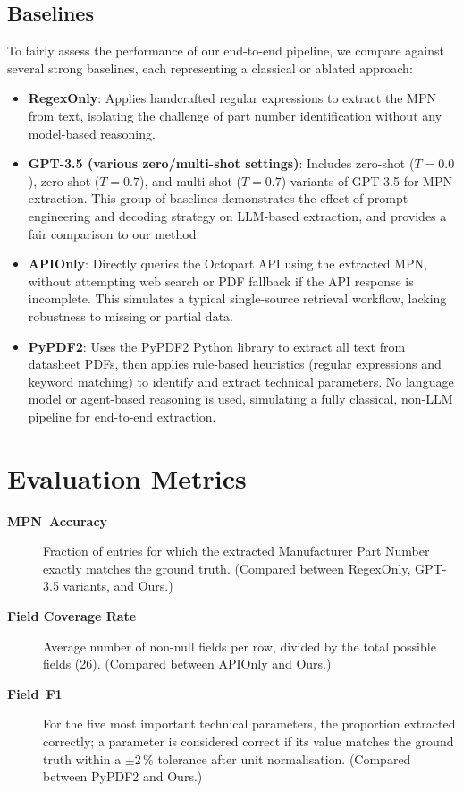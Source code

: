 \subsection{Baselines}
To fairly assess the performance of our end-to-end pipeline, we compare against several strong baselines, each representing a classical or ablated approach:
\begin{itemize}
  \item \textbf{RegexOnly}: Applies handcrafted regular expressions to extract the MPN from text, isolating the challenge of part number identification without any model-based reasoning.
  \item \textbf{GPT-3.5 (various zero/multi-shot settings)}: Includes zero-shot ($T=0.0$), zero-shot ($T=0.7$), and multi-shot ($T=0.7$) variants of GPT-3.5 for MPN extraction. This group of baselines demonstrates the effect of prompt engineering and decoding strategy on LLM-based extraction, and provides a fair comparison to our method.
  \item \textbf{APIOnly}: Directly queries the Octopart API using the extracted MPN, without attempting web search or PDF fallback if the API response is incomplete. This simulates a typical single-source retrieval workflow, lacking robustness to missing or partial data.
  \item \textbf{PyPDF2}: Uses the PyPDF2 Python library to extract all text from datasheet PDFs, then applies rule-based heuristics (regular expressions and keyword matching) to identify and extract technical parameters. No language model or agent-based reasoning is used, simulating a fully classical, non-LLM pipeline for end-to-end extraction.
\end{itemize}

\section{Evaluation Metrics}
\begin{description}
  \item[\textbf{MPN~Accuracy}] Fraction of entries for which the extracted Manufacturer Part Number exactly matches the ground truth. (Compared between RegexOnly, GPT-3.5 variants, and Ours.)
  \item[\textbf{Field Coverage Rate}] Average number of non-null fields per row, divided by the total possible fields (26). (Compared between APIOnly and Ours.)
  \item[\textbf{Field~F1}] For the five most important technical parameters, the proportion extracted correctly; a parameter is considered correct if its value matches the ground truth within a $\pm2\,\%$ tolerance after unit normalisation. (Compared between PyPDF2 and Ours.)
\end{description}


